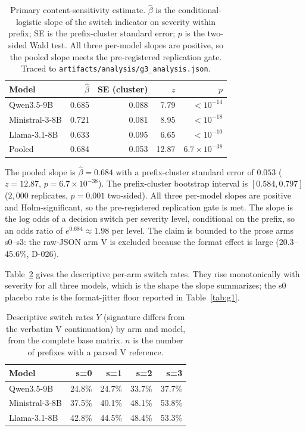 \documentclass[a4paper,fleqn]{cas-sc}
\begin{document}
\begin{table}[pos=htbp]
  \centering
  \caption{Primary content-sensitivity estimate. $\hat\beta$ is the conditional-logistic slope
  of the switch indicator on severity within prefix; SE is the prefix-cluster standard error;
  $p$ is the two-sided Wald test. All three per-model slopes are positive, so the pooled slope
  meets the pre-registered replication gate. Traced to \texttt{artifacts/analysis/g3\_analysis.json}.}
  \label{tab:primary}
  \small
  \begin{tabular}{lrrrr}
    \toprule
    \textbf{Model} & $\hat\beta$ & SE (cluster) & $z$ & $p$ \\
    \midrule
    Qwen3.5-9B     & 0.685 & 0.088 & 7.79 & $<10^{-14}$ \\
    Ministral-3-8B & 0.721 & 0.081 & 8.95 & $<10^{-18}$ \\
    Llama-3.1-8B   & 0.633 & 0.095 & 6.65 & $<10^{-10}$ \\
    \midrule
    Pooled         & 0.684 & 0.053 & 12.87 & $6.7\times10^{-38}$ \\
    \bottomrule
  \end{tabular}
\end{table}

The pooled slope is $\hat\beta = 0.684$ with a prefix-cluster standard error of $0.053$
($z = 12.87$, $p = 6.7\times10^{-38}$). The prefix-cluster bootstrap interval is
$[0.584, 0.797]$ ($2{,}000$ replicates, $p = 0.001$ two-sided). All three per-model slopes
are positive and Holm-significant, so the pre-registered replication gate is met. The slope is
the log odds of a decision switch per severity level, conditional on the prefix, so an odds
ratio of $e^{0.684} \approx 1.98$ per level. The claim is bounded to the prose arms s0--s3:
the raw-JSON arm V is excluded because the format effect is large (20.3--45.6\%, D-026).

Table~\ref{tab:armrates} gives the descriptive per-arm switch rates. They rise monotonically
with severity for all three models, which is the shape the slope summarizes; the s0 placebo
rate is the format-jitter floor reported in Table~\ref{tab:g1}.

\begin{table}[pos=htbp]
  \centering
  \caption{Descriptive switch rates $Y$ (signature differs from the verbatim V continuation)
  by arm and model, from the complete base matrix. $n$ is the number of prefixes with a parsed
  V reference.}
  \label{tab:armrates}
  \small
  \begin{tabular}{lrrrr}
    \toprule
    \textbf{Model} & \textbf{s=0} & \textbf{s=1} & \textbf{s=2} & \textbf{s=3} \\
    \midrule
    Qwen3.5-9B     & 24.8\% & 24.7\% & 33.7\% & 37.7\% \\
    Ministral-3-8B & 37.5\% & 40.1\% & 48.1\% & 53.8\% \\
    Llama-3.1-8B   & 42.8\% & 44.5\% & 48.4\% & 53.3\% \\
    \bottomrule
  \end{tabular}
\end{table}
\end{document}
